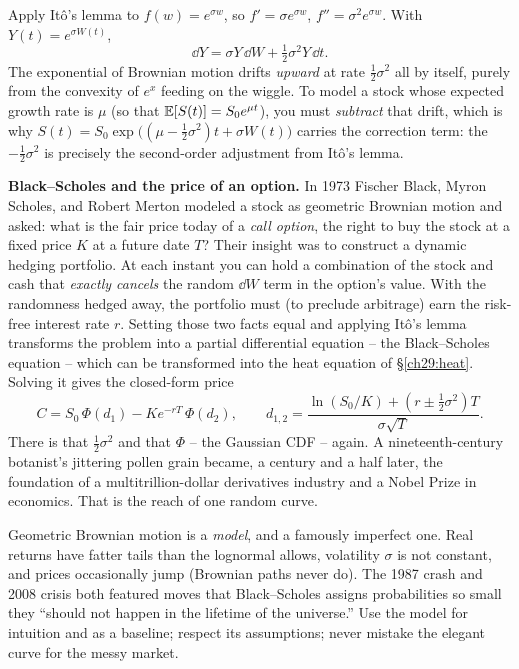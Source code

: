 \begin{example}
\label{ch29:ex-gbm}
Apply It\^o's lemma to $f(w)=e^{\sigma w}$, so $f'=\sigma e^{\sigma w}$,
$f''=\sigma^2 e^{\sigma w}$. With $Y(t)=e^{\sigma W(t)}$,
\[
  \dd Y = \sigma Y\,\dd W + \tfrac12\sigma^2 Y\,\dd t.
\]
The exponential of Brownian motion drifts \emph{upward} at rate
$\tfrac12\sigma^2$ all by itself, purely from the convexity of $e^x$ feeding on
the wiggle. To model a stock whose expected growth rate is $\mu$ (so that
$\operatorname{\mathbb{E}}[S(t)] = S_0 e^{\mu t}$), you must
\emph{subtract} that drift, which is why
$S(t)=S_0\exp\big((\mu-\tfrac12\sigma^2)t+\sigma W(t)\big)$ carries the correction
term: the $-\tfrac12\sigma^2$ is precisely the second-order adjustment from It\^o's lemma.
\end{example}

\begin{applicationbox}
\textbf{Black--Scholes and the price of an option.} In 1973 Fischer Black, Myron
Scholes, and Robert Merton modeled a stock as geometric Brownian motion and asked:
what is the fair price today of a \emph{call option}, the right to buy the stock
at a fixed price $K$ at a future date $T$? Their insight was to construct a dynamic
hedging portfolio. At each instant you can hold a combination of the stock and cash that
\emph{exactly cancels} the random $\dd W$ term in the option's value.
With the randomness hedged away, the portfolio must (to
preclude arbitrage) earn the risk-free interest rate $r$. Setting those two facts
equal and applying It\^o's lemma transforms the problem into a partial differential equation -- the
Black--Scholes equation -- which can be transformed into the heat equation of \S\ref{ch29:heat}.
Solving it gives the closed-form price
\[
  C = S_0\,\Phi(d_1) - K e^{-rT}\,\Phi(d_2),
  \qquad
  d_{1,2} = \frac{\ln(S_0/K) + (r \pm \tfrac12\sigma^2)T}{\sigma\sqrt T}.
\]
There is that $\tfrac12\sigma^2$ and that $\Phi$ -- the Gaussian CDF -- again. A
nineteenth-century botanist's jittering pollen grain became, a century and a half
later, the foundation of a multitrillion-dollar derivatives industry and a Nobel
Prize in economics. That is the reach of one random curve.
\end{applicationbox}

\begin{trapbox}
Geometric Brownian motion is a \emph{model}, and a famously imperfect one. Real
returns have fatter tails than the lognormal allows, volatility $\sigma$ is not
constant, and prices occasionally jump (Brownian paths never do). The 1987 crash
and 2008 crisis both featured moves that Black--Scholes assigns probabilities so
small they ``should not happen in the lifetime of the universe.'' Use the model
for intuition and as a baseline; respect its assumptions; never mistake the
elegant curve for the messy market.
\end{trapbox}

